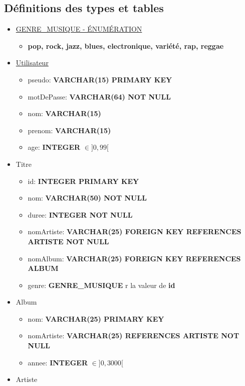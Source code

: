 \documentclass[a4paper,12pt, french]{report}
\begin{document}
  \subsection{Définitions des types et tables}
    \begin{itemize}
      \item \underline{GENRE\_MUSIQUE - ÉNUMÉRATION}
        \begin{itemize}
          \item \textbf{pop, rock, jazz, blues, electronique, variété, rap, reggae}
        \end{itemize}
      \item \underline{Utilisateur}
        \begin{itemize}
          \item pseudo: \textbf{VARCHAR(15) PRIMARY KEY}
          \item motDePasse: \textbf{VARCHAR(64) NOT NULL}
          \item nom: \textbf{VARCHAR(15)}
          \item prenom: \textbf{VARCHAR(15)}
          \item age: \textbf{INTEGER} $\in ]0, 99[$
        \end{itemize}
      \item Titre
        \begin{itemize}
          \item id: \textbf{INTEGER PRIMARY KEY}
          \item nom: \textbf{VARCHAR(50) NOT NULL}
          \item duree: \textbf{INTEGER NOT NULL}
          \item nomArtiste: \textbf{VARCHAR(25) FOREIGN KEY REFERENCES ARTISTE NOT NULL}
          \item nomAlbum: \textbf{VARCHAR(25) FOREIGN KEY REFERENCES ALBUM}
          \item genre: \textbf{GENRE\_MUSIQUE}
r la valeur de \textbf{id}
        \end{itemize}
      \item Album
        \begin{itemize}
          \item nom: \textbf{VARCHAR(25) PRIMARY KEY}
          \item nomArtiste: \textbf{VARCHAR(25) REFERENCES ARTISTE NOT NULL}
          \item annee: \textbf{INTEGER} $\in ]0, 3000[$
        \end{itemize}
      \item Artiste

\end{itemize}
\end{document}
